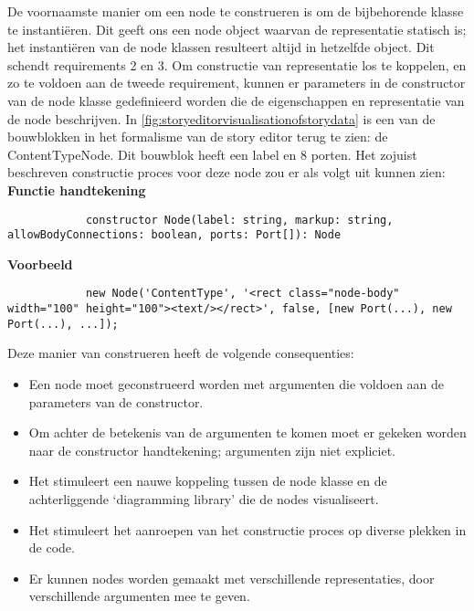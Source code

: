 \noindent De voornaamste manier om een node te construeren is om de bijbehorende klasse te instantiëren. Dit geeft ons een node object waarvan de representatie statisch is; het instantiëren van de node klassen resulteert altijd in hetzelfde object. Dit schendt requirements 2 en 3. Om constructie van representatie los te koppelen, en zo te voldoen aan de tweede requirement, kunnen er parameters in de constructor van de node klasse gedefinieerd worden die de eigenschappen en representatie van de node beschrijven. In \autoref{fig:storyeditorvisualisationofstorydata} is een van de bouwblokken in het formalisme van de story editor terug te zien: de ContentTypeNode. Dit bouwblok heeft een label en 8 porten. Het zojuist beschreven constructie proces voor deze node zou er als volgt uit kunnen zien:\\


        \textbf{Functie handtekening}
        \lstset{language=JavaScript,breaklines=true}
        \begin{lstlisting}
            constructor Node(label: string, markup: string, allowBodyConnections: boolean, ports: Port[]): Node
        \end{lstlisting}

        \textbf{Voorbeeld}
        \lstset{language=JavaScript,breaklines=true}
        \begin{lstlisting}
            new Node('ContentType', '<rect class="node-body" width="100" height="100"><text/></rect>', false, [new Port(...), new Port(...), ...]);
        \end{lstlisting}

\noindent Deze manier van construeren heeft de volgende consequenties:
\begin{itemize}
    \item Een node moet geconstrueerd worden met argumenten die voldoen aan de parameters van de constructor. 
    \item Om achter de betekenis van de argumenten te komen moet er gekeken worden naar de constructor handtekening; argumenten zijn niet expliciet.
    \item Het stimuleert een nauwe koppeling tussen de node klasse en de achterliggende ‘diagramming library’ die de nodes visualiseert.
    \item Het stimuleert het aanroepen van het constructie proces op diverse plekken in de code.
    \item Er kunnen nodes worden gemaakt met verschillende representaties, door verschillende argumenten mee te geven.
\end{itemize}

